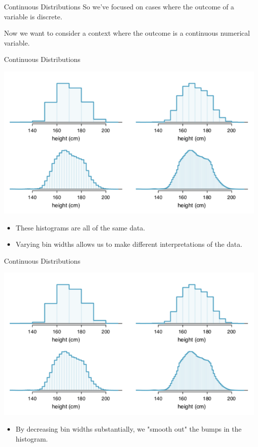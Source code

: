 \begin{frame}{Continuous Distributions}
    So we’ve focused on cases where the outcome of a variable is discrete. 
    
    \vspace{12pt}Now we want to consider a context where the outcome is a continuous numerical variable.
\end{frame}

\begin{frame}{Continuous Distributions}
    \begin{center}
        \includegraphics[scale=0.4]{images/hists.png}
    \end{center}
    
    \vspace{-20pt}\begin{itemize}
        \item These histograms are all of the same data.
        \item Varying bin widths allows us to make different interpretations of the data.
    \end{itemize}
\end{frame}

\begin{frame}{Continuous Distributions}
    \begin{center}
        \includegraphics[scale=0.4]{images/hists.png}
    \end{center}
    
    \vspace{-20pt}\begin{itemize}
        \item By decreasing bin widths substantially, we "smooth out" the bumps in the histogram.
    \end{itemize}
\end{frame}

